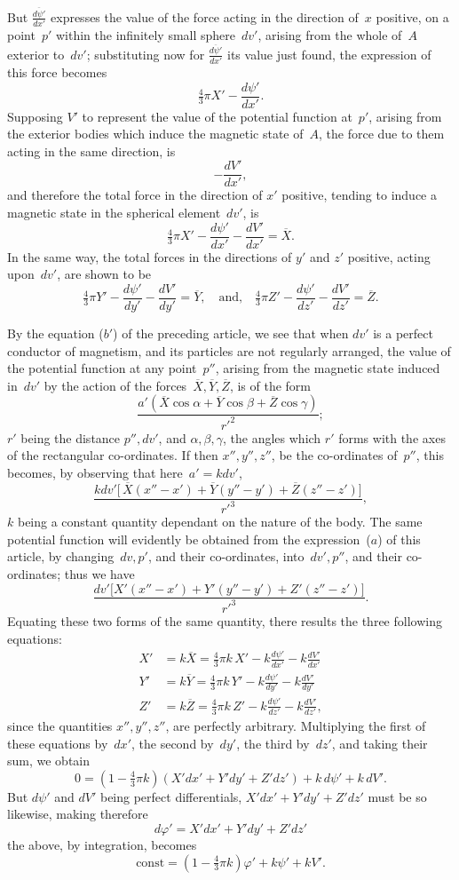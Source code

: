 \documentclass[11pt,notitlepage]{amsart}
\renewcommand{\phi}{\varphi}
\begin{document}
But $\frac{\overline{d\psi'}}{dx'}$ expresses the value
of the force acting in the direction
of~$x$ positive, on a point~$p'$ within the infinitely small sphere~$dv'$, arising from
the whole of~$A$ exterior to~$dv'$;
substituting now for $\frac{\overline{d\psi'}}{dx'}$ its value just found,
the expression of this force becomes
\[
\tfrac43\pi X'-\frac{{d\psi'}}{dx'}.
\]
Supposing $V'$ to represent the value of the potential function at~$p'$, arising
from the exterior bodies which induce the magnetic state of~$A$, the force due
to them acting in the same direction, is
\[
-\frac{dV'}{dx'},
\]
and therefore the total force in the direction of $x'$ positive,
tending to induce
a magnetic state in the spherical element~$dv'$, is
\[
\tfrac43\pi X'-\frac{{d\psi'}}{dx'}-\frac{dV'}{dx'}
=\overline{X}.
\]
In the same way, the total forces in the directions of $y'$ and $z'$ positive,
acting upon~$dv'$, are shown to be
\[
\tfrac43\pi Y'-\frac{{d\psi'}}{dy'}-\frac{dV'}{dy'}=\overline{Y},
\quad\text{and,}\quad
\tfrac43\pi Z'-\frac{{d\psi'}}{dz'}-\frac{dV'}{dz'}=\overline{Z}.
\]

By the equation ($b'$) of the preceding article, we see that when $dv'$
is a perfect conductor of magnetism,
and its particles are not regularly arranged,
the value of the potential function at any point~$p''$,
arising from the magnetic
state induced in~$dv'$ by the action of the
forces~$\overline{X},\overline{Y},\overline{Z}$, is of the form
\[
\frac{a'(\overline{X}\cos\alpha+\overline{Y}\cos\beta+\overline{Z}\cos\gamma)}
{r'^2};
\]
$r'$ being the distance $p'',dv'$, and
$\alpha,\beta,\gamma$, the angles which $r'$ forms with
the axes of the rectangular co-ordinates. If then $x'',y'',z''$, be the
co-ordinates of~$p''$, this becomes, by observing that here~${a'=kdv'}$,
\[
\frac{kdv'\bigl[\,
\overline{X}(x''-x')+\overline{Y}(y''-y')+\overline{Z}(z''-z')
\bigr]}{r'^3},
\]
$k$ being a constant quantity dependant on the nature of the body. The same
potential function will evidently be obtained from the expression~($a$) of this
article, by changing~$dv,p'$, and their co-ordinates, into~$dv',p''$, and their
co-ordinates; thus we have
\[
\frac{dv'\bigl[
X'(x''-x')+Y'(y''-y')+Z'(z''-z')
\bigr]}{r'^3}.
\]
Equating these two forms of the same quantity, there results the three following
equations:
\[
\begin{aligned}
X'&=k\overline{X}=\tfrac43\pi k\,X'-k\frac{d\psi'}{dx'}-k\frac{dV'}{dx'}\\
Y'&=k\overline{Y}=\tfrac43\pi k\,Y'-k\frac{d\psi'}{dy'}-k\frac{dV'}{dy'}\\
Z'&=k\overline{Z}=\tfrac43\pi k\,Z'-k\frac{d\psi'}{dz'}-k\frac{dV'}{dz'},
\end{aligned}
\]
since the quantities $x'',y'',z''$, are perfectly arbitrary.
Multiplying the first
of these equations by~$dx'$, the second by~$dy'$,
the third by~$dz'$, and taking
their sum, we obtain
\[
0=(1-\tfrac43\pi k)(X'dx'+Y'dy'+Z'dz')+k\,d\psi'+k\,dV'.
\]
But $d\psi'$ and $dV'$ being perfect differentials,
$X'dx'+Y'dy'+Z'dz'$ must be
so likewise, making therefore
\[
d\phi'=X'dx'+Y'dy'+Z'dz'
\]
the above, by integration, becomes
\[
\text{const}=(1-\tfrac43\pi k)\phi'+k\psi'+kV'.
\]
\end{document}
